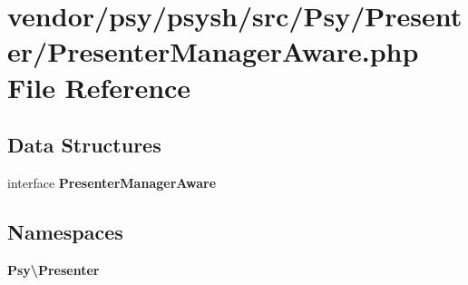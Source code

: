 \section{vendor/psy/psysh/src/\+Psy/\+Presenter/\+Presenter\+Manager\+Aware.php File Reference}
\label{_presenter_manager_aware_8php}
\subsection*{Data Structures}
\begin{DoxyCompactItemize}
\item 
interface {\bf Presenter\+Manager\+Aware}
\end{DoxyCompactItemize}
\subsection*{Namespaces}
\begin{DoxyCompactItemize}
\item 
 {\bf Psy\textbackslash{}\+Presenter}
\end{DoxyCompactItemize}
